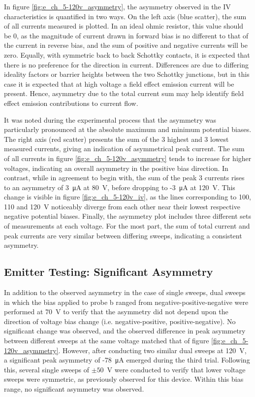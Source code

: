 \begin{refsection}
In figure \ref{fig:e_ch_5-120v_asymmetry}, the asymmetry observed in the IV characteristics is quantified in two ways. On the left axis (blue scatter), the sum of all currents measured is plotted. In an ideal ohmic resistor, this value should be 0, as the magnitude of current drawn in forward bias is no different to that of the current in reverse bias, and the sum of positive and negative currents will be zero. Equally, with symmetric back to back Schottky contacts, it is expected that there is no preference for the direction in current. Differences are due to differing ideality factors or barrier heights between the two Schottky junctions, but in this case it is expected that at high voltage a field effect emission current will be present. Hence, asymmetry due to the total current sum may help identify field effect emission contributions to current flow.

It was noted during the experimental process that the asymmetry was particularly pronounced at the absolute maximum and minimum potential biases. The right axis (red scatter) presents the sum of the 3 highest and 3 lowest measured currents, giving an indication of asymmetrical peak current. The sum of all currents in figure \ref{fig:e_ch_5-120v_asymmetry} tends to increase for higher voltages, indicating an overall asymmetry in the positive bias direction. In contrast, while in agreement to begin with, the sum of the peak 3 currents rises to an asymmetry of 3~\si{\micro\ampere} at 80~\si{\volt}, before dropping to -3~\si{\micro\ampere} at 120~\si{\volt}. This change is visible in figure \ref{fig:e_ch_5-120v_iv}, as the lines corresponding to 100, 110 and 120~\si{\volt} noticeably diverge from each other near their lowest respective negative potential biases. Finally, the asymmetry plot includes three different sets of measurements at each voltage. For the most part, the sum of total current and peak currents are very similar between differing sweeps, indicating a consistent asymmetry.

\subsection{Emitter Testing: Significant Asymmetry}
In addition to the observed asymmetry in the case of single sweeps, dual sweeps in which the bias applied to probe b ranged from negative-positive-negative were performed at 70~\si{\volt} to verify that the asymmetry did not depend upon the direction of voltage bias change (i.e. negative-positive, positive-negative). No significant change was observed, and the observed difference in peak asymmetry between different sweeps at the same voltage matched that of figure \ref{fig:e_ch_5-120v_asymmetry}. However, after conducting two similar dual sweeps at 120~\si{\volt}, a significant peak asymmetry of -78~\si{\micro\ampere} emerged during the third trial. Following this, several single sweeps of $\pm50$~\si{\volt} were conducted to verify that lower voltage sweeps were symmetric, as previously observed for this device. Within this bias range, no significant asymmetry was observed.


\end{refsection}

